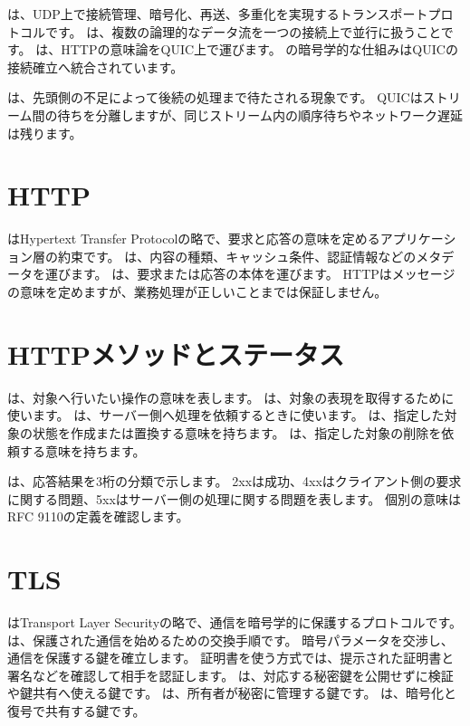 は、UDP上で接続管理、暗号化、再送、多重化を実現するトランスポートプロトコルです。
は、複数の論理的なデータ流を一つの接続上で並行に扱うことです。
は、HTTPの意味論をQUIC上で運びます。
の暗号学的な仕組みはQUICの接続確立へ統合されています。

は、先頭側の不足によって後続の処理まで待たされる現象です。
QUICはストリーム間の待ちを分離しますが、同じストリーム内の順序待ちやネットワーク遅延は残ります。

\section{HTTP}

はHypertext Transfer Protocolの略で、要求と応答の意味を定めるアプリケーション層の約束です。
は、内容の種類、キャッシュ条件、認証情報などのメタデータを運びます。
は、要求または応答の本体を運びます。
HTTPはメッセージの意味を定めますが、業務処理が正しいことまでは保証しません。

\section{HTTPメソッドとステータス}

は、対象へ行いたい操作の意味を表します。
は、対象の表現を取得するために使います。
は、サーバー側へ処理を依頼するときに使います。
は、指定した対象の状態を作成または置換する意味を持ちます。
は、指定した対象の削除を依頼する意味を持ちます。

は、応答結果を3桁の分類で示します。
2xxは成功、4xxはクライアント側の要求に関する問題、5xxはサーバー側の処理に関する問題を表します。
個別の意味はRFC 9110の定義を確認します。

\section{TLS}

はTransport Layer Securityの略で、通信を暗号学的に保護するプロトコルです。
は、保護された通信を始めるための交換手順です。
暗号パラメータを交渉し、通信を保護する鍵を確立します。
証明書を使う方式では、提示された証明書と署名などを確認して相手を認証します。
は、対応する秘密鍵を公開せずに検証や鍵共有へ使える鍵です。
は、所有者が秘密に管理する鍵です。
は、暗号化と復号で共有する鍵です。

